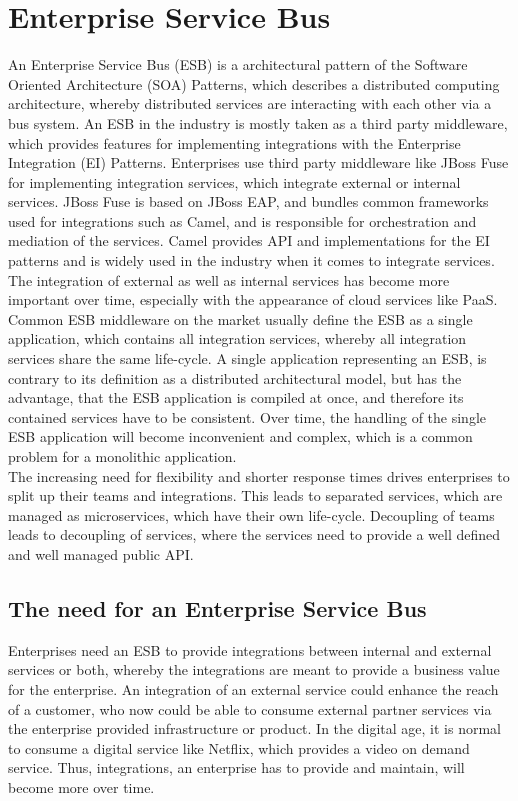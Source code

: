 \chapter{Enterprise Service Bus}
\label{cha:esb}
An Enterprise Service Bus (ESB) is a architectural pattern of the Software Oriented Architecture (SOA) Patterns, which describes a distributed computing architecture, whereby distributed services are interacting with each other via a bus system. An ESB in the industry is mostly taken as a third party middleware, which provides features for implementing integrations with the Enterprise Integration (EI) Patterns. Enterprises use third party middleware like JBoss Fuse for implementing integration services, which integrate external or internal services. JBoss Fuse is based on JBoss EAP, and bundles common frameworks used for integrations such as Camel, and is responsible for orchestration and mediation of the services. Camel provides API and implementations for the EI patterns and is widely used in the industry when it comes to integrate services\cite{CamelIA2018, Camel2015}. \\

The integration of external as well as internal services has become more important over time, especially with the appearance of cloud services like PaaS. Common ESB middleware on the market usually define the ESB as a single application, which contains all integration services, whereby all integration services share the same life-cycle. A single application representing an ESB, is contrary to its definition as a distributed architectural model, but has the advantage, that the ESB application is compiled at once, and therefore its contained services have to be consistent. Over time, the handling of the single ESB application will become inconvenient and complex, which is a common problem for a monolithic application.  \\

The increasing need for flexibility and shorter response times drives enterprises to split up their teams and integrations. This leads to separated services, which are managed as microservices, which have their own life-cycle. Decoupling of teams leads to decoupling of services, where the services need to provide a well defined and well managed public API\cite{Camel2015, RedHatAgileIntegration2017, EIP}.

\section{The need for an Enterprise Service Bus}
\label{sec:esb-need-for-esb}
Enterprises need an ESB to provide integrations between internal and external services or both, whereby the integrations are meant to provide a business value for the enterprise. An integration of an external service could enhance the reach of a customer, who now could be able to consume external partner services via the enterprise provided infrastructure or product. In the digital age, it is normal to consume a digital service like Netflix, which provides a video on demand service. Thus, integrations, an enterprise has to provide and maintain, will become more over time.

